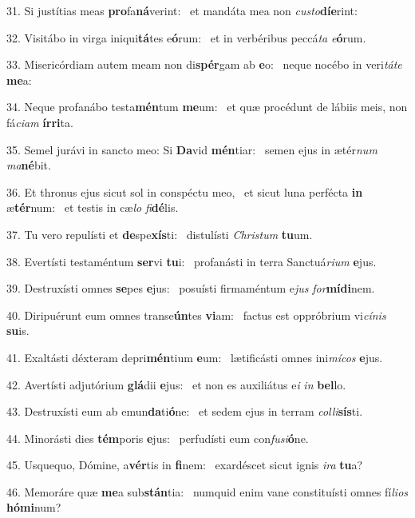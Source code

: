 31. Si justítias meas \textbf{pro}fa\textbf{ná}verint: \ast\  et mandáta mea non \textit{cus}\textit{to}\textbf{dí}\textbf{e}rint:\

32. Visitábo in virga iniqui\textbf{tá}tes e\textbf{ó}rum: \ast\  et in verbéribus peccá\textit{ta} \textit{e}\textbf{ó}rum.\

33. Misericórdiam autem meam non di\textbf{spér}gam ab \textbf{e}o: \ast\  neque nocébo in veri\textit{tá}\textit{te} \textbf{me}a:\

34. Neque profanábo testa\textbf{mén}tum \textbf{me}um: \ast\  et quæ procédunt de lábiis meis, non fá\textit{ci}\textit{am} \textbf{ír}\textbf{ri}ta.\

35. Semel jurávi in sancto meo: Si \textbf{Da}vid \textbf{mén}tiar: \ast\  semen ejus in ætér\textit{num} \textit{ma}\textbf{né}bit.\

36. Et thronus ejus sicut sol in conspéctu meo, \dag\  et sicut luna perfécta \textbf{in} æ\textbf{tér}num: \ast\  et testis in cæ\textit{lo} \textit{fi}\textbf{dé}lis.\

37. Tu vero repulísti et \textbf{de}spe\textbf{xís}ti: \ast\  distulísti \textit{Chris}\textit{tum} \textbf{tu}um.\

38. Evertísti testaméntum \textbf{ser}vi \textbf{tu}i: \ast\  profanásti in terra Sanctuá\textit{ri}\textit{um} \textbf{e}jus.\

39. Destruxísti omnes \textbf{se}pes \textbf{e}jus: \ast\  posuísti firmaméntum e\textit{jus} \textit{for}\textbf{mí}\textbf{di}nem.\

40. Diripuérunt eum omnes transe\textbf{ún}tes \textbf{vi}am: \ast\  factus est oppróbrium vi\textit{cí}\textit{nis} \textbf{su}is.\

41. Exaltásti déxteram depri\textbf{mén}tium \textbf{e}um: \ast\  lætificásti omnes ini\textit{mí}\textit{cos} \textbf{e}jus.\

42. Avertísti adjutórium \textbf{glá}dii \textbf{e}jus: \ast\  et non es auxiliátus e\textit{i} \textit{in} \textbf{bel}lo.\

43. Destruxísti eum ab emun\textbf{da}ti\textbf{ó}ne: \ast\  et sedem ejus in terram \textit{col}\textit{li}\textbf{sís}ti.\

44. Minorásti dies \textbf{tém}poris \textbf{e}jus: \ast\  perfudísti eum con\textit{fu}\textit{si}\textbf{ó}ne.\

45. Usquequo, Dómine, a\textbf{vér}tis in \textbf{fi}nem: \ast\  exardéscet sicut ignis \textit{i}\textit{ra} \textbf{tu}a?\

46. Memoráre quæ \textbf{me}a sub\textbf{stán}tia: \ast\  numquid enim vane constituísti omnes fí\textit{li}\textit{os} \textbf{hó}\textbf{mi}num?\

